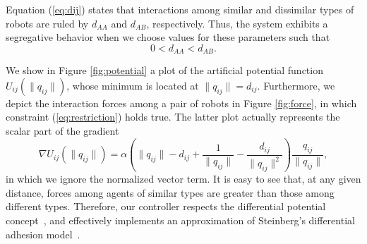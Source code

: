 \documentclass[letterpaper, 10 pt, conference]{ieeeconf}  %
\newcommand{\norm}[1]{\lVert#1\rVert}
\begin{document}
Equation (\ref{eq:dij}) states that interactions among similar and
dissimilar types of robots are ruled by $d_{AA}$ and $d_{AB}$,
respectively. Thus, the system exhibits a segregative behavior when we
choose values for these parameters such that
\begin{equation}
  \label{eq:restriction}
  0 < d_{AA} < d_{AB}.
\end{equation}

We show in Figure \ref{fig:potential} a plot of the artificial
potential function $U_{ij}(\norm{q_{ij}})$, whose minimum is located
at $\norm{q_{ij}} = d_{ij}$. Furthermore, we depict the interaction
forces among a pair of robots in Figure \ref{fig:force}, in which
constraint (\ref{eq:restriction}) holds true. The latter plot actually
represents the scalar part of the gradient
\begin{equation}
  \label{eq:gradient}
  \nabla U_{ij}(\norm{q_{ij}}) = \alpha \left(\norm{q_{ij}} - d_{ij} + \frac{1}{\norm{q_{ij}}} - \frac{d_{ij}}{\norm{q_{ij}}^2}\right) \frac{q_{ij}}{\norm{q_{ij}}},
\end{equation}
in which we ignore the normalized vector term. It is easy to see that,
at any given distance, forces among agents of similar types are
greater than those among different types. Therefore, our controller
respects the differential potential concept~\cite{Kumar:10}, and
effectively implements an approximation of Steinberg's differential
adhesion model~\cite{Steinberg:63}.
\end{document}
